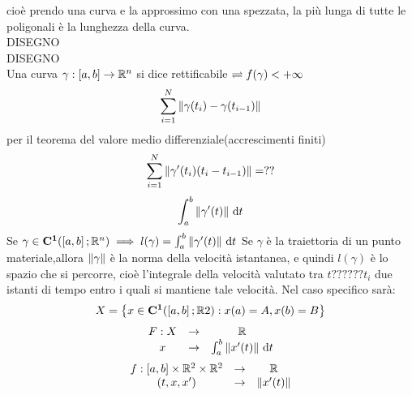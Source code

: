 cioè prendo una curva e la approssimo con una spezzata, la più lunga di tutte le poligonali è la lunghezza della curva.\\
DISEGNO\\
DISEGNO\\
Una curva $\gamma : \left[a,b\right] \to \mathbb{R}^n$ si dice rettificabile $\rightleftharpoons f(\gamma)<+\infty$
\observation
\[\sum\limits_{i=1}^{N}\left\|\gamma(t_i)-\gamma(t_{i-1})\right\| \]
per il teorema del valore medio differenziale(accrescimenti finiti)
\[\sum\limits_{i=1}^{N}\left\| \gamma'(t_i)(t_i-t_{i-1})\right\| =??\]
\[\int_{a}^{b}\left\| \gamma'(t)\right\| \,\mathrm{d}{t}\]
\proposition
Se $\gamma\in \mathbf{C^{1}}(\left[a,b\right]; \mathbb{R} ^n)\implies l(\gamma)=\int_a^b\left\|\gamma'(t)\right\|\,\mathrm{d}{t}$
\observation
Se $\gamma$ è la traiettoria di un punto materiale,allora $\left\|\gamma\right\|$ è la norma della velocità istantanea, e quindi $l(\gamma)$ è lo spazio che si percorre, cioè l'integrale della velocità valutato tra $t??????t_i$ due istanti di tempo entro i quali si mantiene tale velocità.
\observation
Nel caso specifico sarà:
\[ X=\left\{ x\in \mathbf{C^{1}}(\left[a,b\right]; \mathbb{R} 2): x(a)=A, x(b)=B \right\} \]
\[\begin{array}{ccc} 
F: X & \to & \mathbb{R} \\
x & \to & \int_{a}^b \left\|x'(t)\right\|\,\mathrm{d}{t}
\end{array}\]
\[\begin{array}{ccc} 
f: \left[a,b\right]\times \mathbb{R} ^2\times \mathbb{R} ^2 & \to & \mathbb{R} \\
(t,x, x') & \to &  \left\|x'(t)\right\|
\end{array}\]
\newpage
